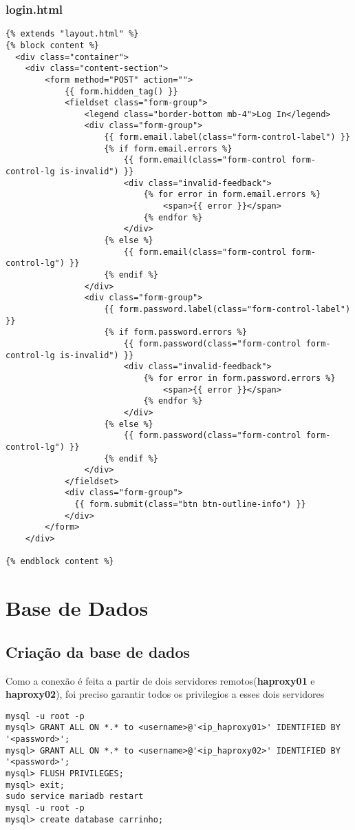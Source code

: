 \documentclass{report}
\begin{document}
\subsubsection{login.html}
\begin{lstlisting}
{% extends "layout.html" %}
{% block content %}
  <div class="container">
    <div class="content-section">
        <form method="POST" action="">
            {{ form.hidden_tag() }}
            <fieldset class="form-group">
                <legend class="border-bottom mb-4">Log In</legend>
                <div class="form-group">
                    {{ form.email.label(class="form-control-label") }}
                    {% if form.email.errors %}
                        {{ form.email(class="form-control form-control-lg is-invalid") }}
                        <div class="invalid-feedback">
                            {% for error in form.email.errors %}
                                <span>{{ error }}</span>
                            {% endfor %}
                        </div>
                    {% else %}
                        {{ form.email(class="form-control form-control-lg") }}
                    {% endif %}
                </div>
                <div class="form-group">
                    {{ form.password.label(class="form-control-label") }}
                    {% if form.password.errors %}
                        {{ form.password(class="form-control form-control-lg is-invalid") }}
                        <div class="invalid-feedback">
                            {% for error in form.password.errors %}
                                <span>{{ error }}</span>
                            {% endfor %}
                        </div>
                    {% else %}
                        {{ form.password(class="form-control form-control-lg") }}
                    {% endif %}
                </div>
            </fieldset>
            <div class="form-group">
              {{ form.submit(class="btn btn-outline-info") }}
            </div>
        </form>
    </div>

{% endblock content %}
\end{lstlisting}

\section{Base de Dados}
\subsection{Criação da base de dados}
Como a conexão é feita a partir de dois servidores remotos(\textbf{haproxy01} e \textbf{haproxy02}), foi preciso garantir todos os privilegios a esses dois servidores
\begin{lstlisting}
mysql -u root -p
mysql> GRANT ALL ON *.* to <username>@'<ip_haproxy01>' IDENTIFIED BY '<password>';
mysql> GRANT ALL ON *.* to <username>@'<ip_haproxy02>' IDENTIFIED BY '<password>';
mysql> FLUSH PRIVILEGES;
mysql> exit;
sudo service mariadb restart
mysql -u root -p
mysql> create database carrinho;
\end{lstlisting}
\end{document}
